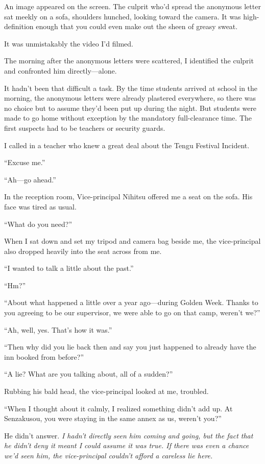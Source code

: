 \documentclass[
    a4paper,
    12pt,
    twoside,
    openany,
    UTF8,
    fontset=windows
]{ctexbook}
\begin{document}
An image appeared on the screen. The culprit who'd spread the anonymous letter sat meekly on a sofa, shoulders hunched, looking toward the camera. It was high-definition enough that you could even make out the sheen of greasy sweat.

It was unmistakably the video I'd filmed.

The morning after the anonymous letters were scattered, I identified the culprit and confronted him directly---alone.

It hadn't been that difficult a task. By the time students arrived at school in the morning, the anonymous letters were already plastered everywhere, so there was no choice but to assume they'd been put up during the night. But students were made to go home without exception by the mandatory full-clearance time. The first suspects had to be teachers or security guards.

I called in a teacher who knew a great deal about the Tengu Festival Incident.

``Excuse me.''

``Ah---go ahead.''

In the reception room, Vice-principal Nihitsu offered me a seat on the sofa. His face was tired as usual.

``What do you need?''

When I sat down and set my tripod and camera bag beside me, the vice-principal also dropped heavily into the seat across from me.

``I wanted to talk a little about the past.''

``Hm?''

``About what happened a little over a year ago---during Golden Week. Thanks to you agreeing to be our supervisor, we were able to go on that camp, weren't we?''

``Ah, well, yes. That's how it was.''

``Then why did you lie back then and say you just happened to already have the inn booked from before?''

``A lie? What are you talking about, all of a sudden?''

Rubbing his bald head, the vice-principal looked at me, troubled.

``When I thought about it calmly, I realized something didn't add up. At Senzakusou, you were staying in the same annex as us, weren't you?''

He didn't answer. \textit{I hadn't directly seen him coming and going, but the fact that he didn't deny it meant I could assume it was true. If there was even a chance we'd seen him, the vice-principal couldn't afford a careless lie here.}
\end{document}

